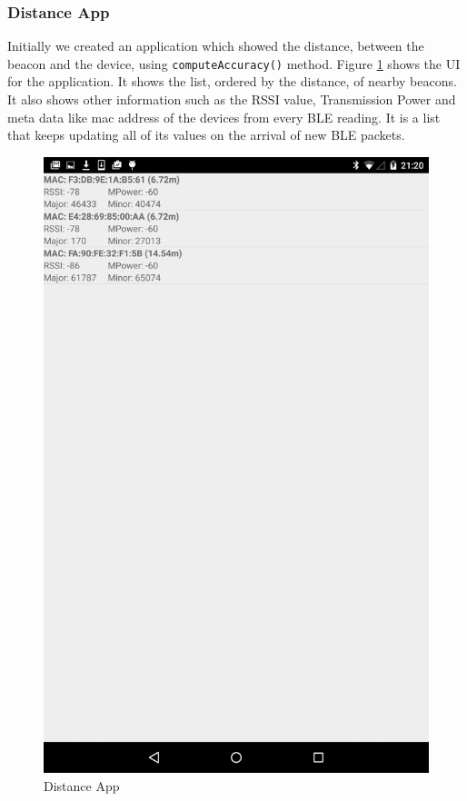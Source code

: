 \subsubsection{Distance App} \label{nocamera_distanceapp}
Initially we created an application which showed the distance, between the beacon and the device, using \lstinline|computeAccuracy()| method. Figure \ref{distance_app_image} shows the UI for the application. It shows the list, ordered by the distance, of nearby beacons. It also shows other information such as the RSSI value, Transmission Power and meta data like mac address of the devices from every BLE reading.
It is a list that keeps updating all of its values on the arrival of new BLE packets.

\begin{figure}[h]
\centering
  \includegraphics[scale=0.2]{images/distance}
  \protect\caption{Distance App} 
  \label{distance_app_image}
\end{figure}

